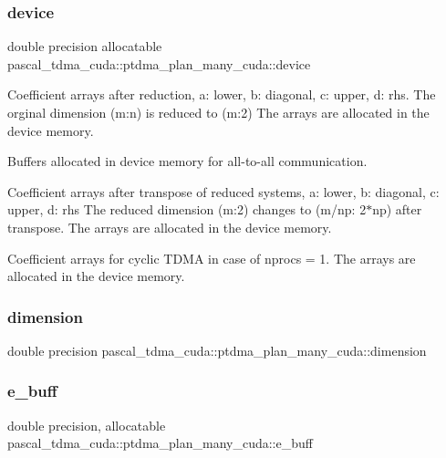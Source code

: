 \subsubsection{\texorpdfstring{device}{device}}
{\footnotesize\ttfamily double precision allocatable pascal\+\_\+tdma\+\_\+cuda\+::ptdma\+\_\+plan\+\_\+many\+\_\+cuda\+::device}



Coefficient arrays after reduction, a\+: lower, b\+: diagonal, c\+: upper, d\+: rhs. The orginal dimension (m\+:n) is reduced to (m\+:2) The arrays are allocated in the device memory. 

Buffers allocated in device memory for all-\/to-\/all communication.

Coefficient arrays after transpose of reduced systems, a\+: lower, b\+: diagonal, c\+: upper, d\+: rhs The reduced dimension (m\+:2) changes to (m/np\+: 2$\ast$np) after transpose. The arrays are allocated in the device memory.

Coefficient arrays for cyclic T\+D\+MA in case of nprocs = 1. The arrays are allocated in the device memory. \mbox{\label{structpascal__tdma__cuda_1_1ptdma__plan__many__cuda_a7a74d732f01a8db80e6fea40237fd619}} 
\subsubsection{\texorpdfstring{dimension}{dimension}}
{\footnotesize\ttfamily double precision pascal\+\_\+tdma\+\_\+cuda\+::ptdma\+\_\+plan\+\_\+many\+\_\+cuda\+::dimension}

\mbox{\label{structpascal__tdma__cuda_1_1ptdma__plan__many__cuda_a1a98ce23bb02a30a0fdf3cbc3bbce8c6}} 
\subsubsection{\texorpdfstring{e\+\_\+buff}{e\_buff}}
{\footnotesize\ttfamily double precision, allocatable pascal\+\_\+tdma\+\_\+cuda\+::ptdma\+\_\+plan\+\_\+many\+\_\+cuda\+::e\+\_\+buff}

